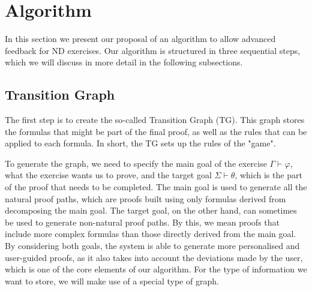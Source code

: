 \section{Algorithm}
In this section we present our proposal of an algorithm to allow advanced feedback for ND exercises.
Our algorithm is structured in three sequential steps, which we will discuss in more detail in the following subsections.


\subsection{Transition Graph}
The first step is to create the so-called Transition Graph (TG). This graph stores the formulas that might be part of the final proof, as well as the rules that can be applied to each formula. In short, the TG sets up the rules of the "game".

To generate the graph, we need to specify the main goal of the exercise \(\Gamma \vdash \varphi\), what the exercise wants us to prove, and the target goal \(\Sigma \vdash \theta\), which is the part of the proof that needs to be completed. The main goal is used to generate all the natural proof paths, which are proofs built using only formulas derived from decomposing the main goal. The target goal, on the other hand, can sometimes be used to generate non-natural proof paths. By this, we mean proofs that include more complex formulas than those directly derived from the main goal. By considering both goals, the system is able to generate more personalised and user-guided proofs, as it also takes into account the deviations made by the user, which is one of the core elements of our algorithm. For the type of information we want to store, we will make use of a special type of graph.

